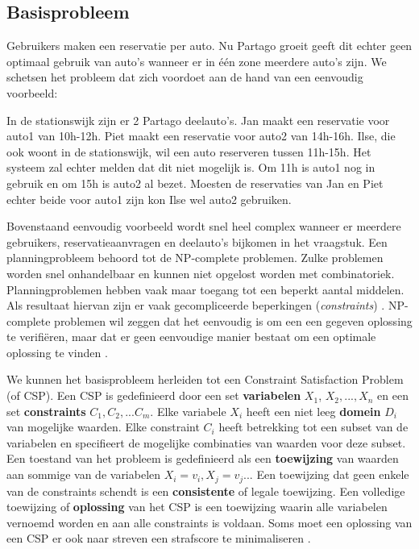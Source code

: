 \subsection{Basisprobleem}
Gebruikers maken een reservatie per auto. Nu Partago groeit geeft dit echter geen optimaal gebruik van auto's wanneer er in één zone meerdere auto's zijn. 
We schetsen het probleem dat zich voordoet aan de hand van een eenvoudig voorbeeld: 

In de stationswijk zijn er 2 Partago deelauto's. Jan maakt een reservatie voor auto1 van 10h-12h. Piet maakt een reservatie voor auto2 van 14h-16h. Ilse, die ook woont in de stationswijk, wil een auto reserveren tussen 11h-15h. Het systeem zal echter melden dat dit niet mogelijk is. Om 11h is auto1 nog in gebruik en om 15h is auto2 al bezet. Moesten de reservaties van Jan en Piet echter beide voor auto1 zijn kon Ilse wel auto2 gebruiken.

Bovenstaand eenvoudig voorbeeld wordt snel heel complex wanneer er meerdere gebruikers, reservatieaanvragen en deelauto's bijkomen in het vraagstuk.
Een planningprobleem behoord tot de NP-complete problemen. Zulke problemen worden snel onhandelbaar en kunnen niet opgelost worden met combinatoriek. Planningproblemen hebben vaak maar toegang tot een beperkt aantal middelen. Als resultaat hiervan zijn er vaak gecompliceerde beperkingen (\textit{constraints}) \autocite{negnevitsky}.
NP-complete problemen wil zeggen dat het eenvoudig is om een een gegeven oplossing te verifiëren, maar dat er geen eenvoudige manier bestaat om een optimale oplossing te vinden \autocite{manualoptaplanner}.

We kunnen het basisprobleem herleiden tot een Constraint Satisfaction Problem (of CSP). Een CSP is gedefinieerd door een set \textbf{variabelen} $X_{1}$, $X_{2},...,X_{n}$ en een set \textbf{constraints} $C_{1}, C_{2},...C_{m}$. Elke variabele $X_{i}$ heeft een niet leeg \textbf{domein} $D_{i}$ van mogelijke waarden. Elke constraint $C_{i}$ heeft betrekking tot een subset van de variabelen en specifieert de mogelijke combinaties van waarden voor deze subset. Een toestand van het probleem is gedefinieerd als een \textbf{toewijzing} van waarden aan sommige van de variabelen $X_{i} =  v_{i}, X_{j} = v_{j}$... Een toewijzing dat geen enkele van de constraints schendt is een \textbf{consistente} of legale toewijzing. Een volledige toewijzing of \textbf{oplossing} van het CSP is een toewijzing waarin alle variabelen vernoemd worden en aan alle constraints is voldaan. Soms moet een oplossing van een CSP er ook naar streven een strafscore te minimaliseren \autocite{norvig}.


